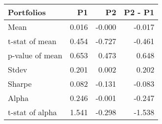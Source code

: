 \begin{tabular}{lrrr}
\toprule
Portfolios & P1 & P2 & P2 - P1 \\
\midrule
Mean & 0.016 & -0.000 & -0.017 \\
t-stat of mean & 0.454 & -0.727 & -0.461 \\
p-value of mean & 0.653 & 0.473 & 0.648 \\
Stdev & 0.201 & 0.002 & 0.202 \\
Sharpe & 0.082 & -0.131 & -0.083 \\
Alpha & 0.246 & -0.001 & -0.247 \\
t-stat of alpha & 1.541 & -0.298 & -1.538 \\
\bottomrule
\end{tabular}
